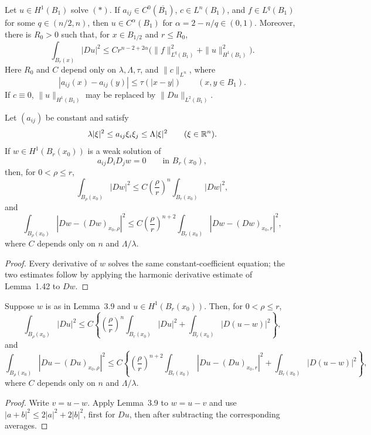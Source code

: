 \begin{theorem}\label{hanlin:weaksol-part1-holder-sol}
Let $u\in H^1(B_1)$ solve $(\ast)$. If
$a_{ij}\in C^0(\overline{B_1})$, $c\in L^n(B_1)$, and
$f\in L^q(B_1)$ for some $q\in(n/2,n)$, then
$u\in C^\alpha(B_1)$ for $\alpha=2-n/q\in(0,1)$.
Moreover, there is $R_0>0$ such that, for $x\in B_{1/2}$ and $r\leq R_0$,
\[
\int_{B_r(x)}|Du|^2
\leq Cr^{n-2+2\alpha}
\bigl(\|f\|_{L^q(B_1)}^2+\|u\|_{H^1(B_1)}^2\bigr).
\]
Here $R_0$ and $C$ depend only on $\lambda,\Lambda,\tau$, and
$\|c\|_{L^n}$, where
\[
|a_{ij}(x)-a_{ij}(y)|\leq\tau(|x-y|)
\qquad(x,y\in B_1).
\]
If $c\equiv0$, $\|u\|_{H^1(B_1)}$ may be replaced by
$\|Du\|_{L^2(B_1)}$.
\end{theorem}

\begin{lemma}\label{hanlin:weaksol-part1-harmonic-lemma}
Let $(a_{ij})$ be constant and satisfy
\[
\lambda|\xi|^2\leq a_{ij}\xi_i\xi_j\leq\Lambda|\xi|^2
\qquad(\xi\in\mathbb{R}^n).
\]
If $w\in H^1(B_r(x_0))$ is a weak solution of
\[
a_{ij}D_iD_jw=0\qquad\text{in }B_r(x_0),
\]
then, for $0<\rho\leq r$,
\[
\int_{B_\rho(x_0)}|Dw|^2
\leq C\left(\frac\rho r\right)^n\int_{B_r(x_0)}|Dw|^2,
\]
and
\[
\int_{B_\rho(x_0)}|Dw-(Dw)_{x_0,\rho}|^2
\leq C\left(\frac\rho r\right)^{n+2}
\int_{B_r(x_0)}|Dw-(Dw)_{x_0,r}|^2,
\]
where $C$ depends only on $n$ and $\Lambda/\lambda$.
\end{lemma}
\begin{proof}
\sketch Every derivative of $w$ solves the same constant-coefficient equation;
the two estimates follow by applying the harmonic derivative estimate of
Lemma~1.42 to $Dw$.
\end{proof}

\begin{corollary}\label{hanlin:weaksol-part1-cor-3-10}
Suppose $w$ is as in Lemma~3.9 and $u\in H^1(B_r(x_0))$. Then, for
$0<\rho\leq r$,
\[
\int_{B_\rho(x_0)}|Du|^2
\leq C\left\{
\left(\frac\rho r\right)^n\int_{B_r(x_0)}|Du|^2
+\int_{B_r(x_0)}|D(u-w)|^2\right\},
\]
and
\[
\int_{B_\rho(x_0)}|Du-(Du)_{x_0,\rho}|^2
\leq C\left\{
\left(\frac\rho r\right)^{n+2}
\int_{B_r(x_0)}|Du-(Du)_{x_0,r}|^2
+\int_{B_r(x_0)}|D(u-w)|^2\right\},
\]
where $C$ depends only on $n$ and $\Lambda/\lambda$.
\end{corollary}
\begin{proof}
\sketch Write $v=u-w$. Apply Lemma~3.9 to $w=u-v$ and use
$|a+b|^2\leq2|a|^2+2|b|^2$, first for $Du$, then after subtracting the
corresponding averages.
\end{proof}

